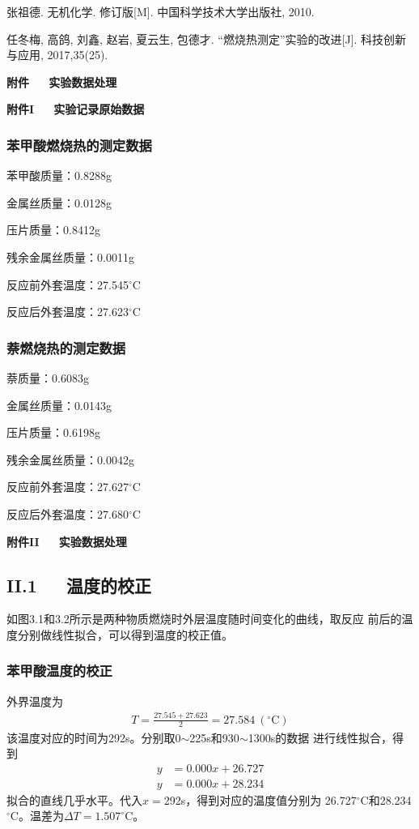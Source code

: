 \documentclass[12pt]{ctexart}
\numberwithin{equation}{section}
\begin{document}
\noindent
[2] 张祖德. 无机化学. 修订版[M]. 中国科学技术大学出版社, 2010.

\noindent
[3] 任冬梅, 高鸽, 刘鑫, 赵岩, 夏云生, 包德才. “燃烧热测定”实验的改进[J]. 科技创新与应用, 2017,35(25).

\newpage

\begin{center}
    \LARGE\bfseries{附件~~~实验数据处理}
\end{center}
\begin{center}
    \Large\bfseries{附件I~~~实验记录原始数据}
\end{center}

\subsubsection*{苯甲酸燃烧热的测定数据}
苯甲酸质量：0.8288g

金属丝质量：0.0128g

压片质量：0.8412g

残余金属丝质量：0.0011g

反应前外套温度：27.545$^\circ$C

反应后外套温度：27.623$^\circ$C

\subsubsection*{萘燃烧热的测定数据}

萘质量：0.6083g

金属丝质量：0.0143g

压片质量：0.6198g

残余金属丝质量：0.0042g

反应前外套温度：27.627$^\circ$C

反应后外套温度：27.680$^\circ$C

\begin{center}
    \Large\bfseries{附件II~~~实验数据处理}
\end{center}
\subsection*{II.1~~~温度的校正}
如图3.1和3.2所示是两种物质燃烧时外层温度随时间变化的曲线，取反应
前后的温度分别做线性拟合，可以得到温度的校正值。

\subsubsection*{苯甲酸温度的校正}
外界温度为
\begin{align*}
    T = \frac{27.545 + 27.623}{2} = 27.584~(^\circ\mathrm{C})
\end{align*}
该温度对应的时间为292s。分别取0$\sim$225s和930$\sim$1300s的数据
进行线性拟合，得到
\begin{align*}
    y &= 0.000x + 26.727 \\
    y &= 0.000x + 28.234
\end{align*}
拟合的直线几乎水平。代入$x = $292s，得到对应的温度值分别为
26.727$^\circ$C和28.234$^\circ$C。温差为$\Delta T = 1.507^\circ$C。
\end{document}

